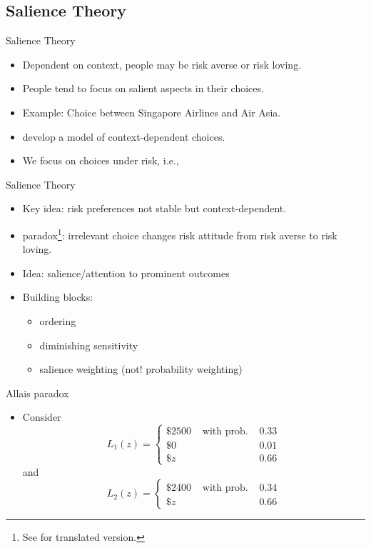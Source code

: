 \documentclass[11pt, aspectratio=169]{beamer}
\begin{document}
\subsection{Salience Theory}


\begin{frame}{Salience Theory}
\begin{itemize}
\item Dependent on context, people may be risk averse or risk loving.\medskip
\item People tend to focus on salient aspects in their choices.\medskip
\item Example: Choice between Singapore Airlines and Air Asia.\medskip
\item \citet{BordaloGennaioliShleifer2012, BordaloGennaioliShleifer2013a, BordaloGennaioliShleifer2013b} develop a model of context-dependent choices.\medskip
\item We focus on choices under risk, i.e., \citet{BordaloGennaioliShleifer2012}
\end{itemize}
\end{frame}

\begin{frame}{Salience Theory}
    \begin{itemize}
        \item Key idea: risk preferences not stable but context-dependent.\medskip
        \item \citet{Allais1953} paradox\footnote{See \citet{Allais1979} for translated version.}: irrelevant choice changes risk attitude from risk averse to risk loving.\medskip
        \item Idea: salience/attention to prominent outcomes\medskip
        \item Building blocks:\smallskip
        \begin{itemize}
            \item ordering\medskip
            \item diminishing sensitivity\medskip
            \item salience weighting (\alert{not!} probability weighting)\medskip
        \end{itemize}
	\end{itemize}
\end{frame}

\begin{frame}[t]{Allais paradox}
\begin{itemize}
\item Consider\[L_1(z)=\left\{\begin{array}{lll}\$ 2500 & \text { with prob. } & 0.33\\ \$0 & & 0.01 \\ \$ z & & 0.66\end{array}\right.\]
and
\[L_2(z)=\left\{\begin{array}{lll}\$ 2400 & \text { with prob. } & 0.34 \\ \$ z & & 0.66\end{array}\right.\]\medskip
\end{itemize}
\end{frame}
\end{document}
